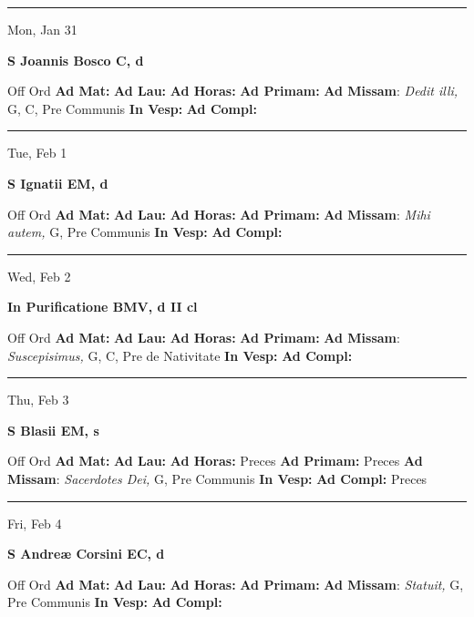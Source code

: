 \documentclass[letterpaper, 10pt]{article}
\begin{document}
\hrule
\begin{center}
Mon, Jan 31
\end{center}\textbf{ \large S Joannis Bosco C, \textnormal{\normalsize d}}
\begin{justify}
Off Ord
\textbf{Ad Mat: }
\textbf{Ad Lau: }
\textbf{Ad Horas: }
\textbf{Ad Primam: }
\textbf{Ad Missam}: \textit{Dedit illi,} G, C, Pre Communis
\textbf{In Vesp: }
\textbf{Ad Compl: }\end{justify}



\hrule
\begin{center}
Tue, Feb 1
\end{center}\textbf{ \large S Ignatii EM, \textnormal{\normalsize d}}
\begin{justify}
Off Ord
\textbf{Ad Mat: }
\textbf{Ad Lau: }
\textbf{Ad Horas: }
\textbf{Ad Primam: }
\textbf{Ad Missam}: \textit{Mihi autem,} G, Pre Communis
\textbf{In Vesp: }
\textbf{Ad Compl: }\end{justify}



\hrule
\begin{center}
Wed, Feb 2
\end{center}\textbf{ \large In Purificatione BMV, \textnormal{\normalsize d II cl}}
\begin{justify}
Off Ord
\textbf{Ad Mat: }
\textbf{Ad Lau: }
\textbf{Ad Horas: }
\textbf{Ad Primam: }
\textbf{Ad Missam}: \textit{Suscepisimus,} G, C, Pre de Nativitate
\textbf{In Vesp: }
\textbf{Ad Compl: }\end{justify}



\hrule
\begin{center}
Thu, Feb 3
\end{center}\textbf{ \large S Blasii EM, \textnormal{\normalsize s}}
\begin{justify}
Off Ord
\textbf{Ad Mat: }
\textbf{Ad Lau: }
\textbf{Ad Horas: }Preces
\textbf{Ad Primam: }Preces
\textbf{Ad Missam}: \textit{Sacerdotes Dei,} G, Pre Communis
\textbf{In Vesp: }
\textbf{Ad Compl: }Preces\end{justify}



\hrule
\begin{center}
Fri, Feb 4
\end{center}\textbf{ \large S Andreæ Corsini EC, \textnormal{\normalsize d}}
\begin{justify}
Off Ord
\textbf{Ad Mat: }
\textbf{Ad Lau: }
\textbf{Ad Horas: }
\textbf{Ad Primam: }
\textbf{Ad Missam}: \textit{Statuit,} G, Pre Communis
\textbf{In Vesp: }
\textbf{Ad Compl: }\end{justify}
\end{document}
